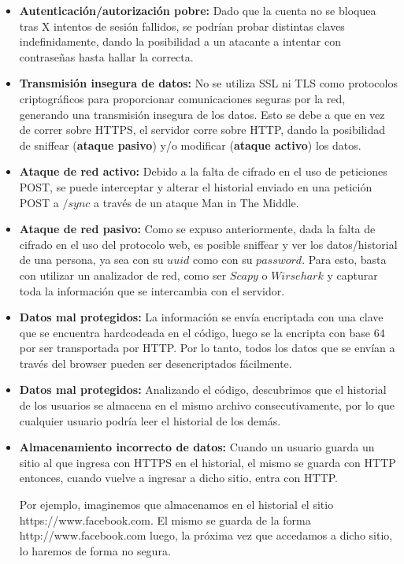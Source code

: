 \documentclass[10pt, a4paper]{article}
\begin{document}
\begin{itemize}
\item \textbf{Autenticación/autorización pobre:} Dado que la cuenta no se bloquea tras X intentos de sesión fallidos, se podrían probar distintas claves indefinidamente, dando la posibilidad a un atacante a intentar con contraseñas hasta hallar la correcta. 

\item \textbf{Transmisión insegura de datos:} No se utiliza SSL ni TLS como protocolos criptográficos para proporcionar comunicaciones seguras por la red, generando una transmisión insegura de los datos. Esto se debe a que en vez de correr sobre HTTPS, el servidor corre sobre HTTP, dando la posibilidad de sniffear (\textbf{ataque pasivo}) y/o modificar (\textbf{ataque activo}) los datos.

\item \textbf{Ataque de red activo:} Debido a la falta de cifrado en el uso de peticiones POST, se puede interceptar y alterar el historial enviado en una petición POST a $/sync$ a través de un ataque Man in The Middle.

\item \textbf{Ataque de red pasivo:} Como se expuso anteriormente, dada la falta de cifrado en el uso del protocolo web, es posible sniffear y ver los datos/historial de una persona, ya sea con su $uuid$ como con su $password$. Para esto, basta con utilizar un analizador de red, como ser $Scapy$ o $Wirsehark$ y capturar toda la información que se intercambia con el servidor.

\item \textbf{Datos mal protegidos:} La información se envía encriptada con una clave que se encuentra hardcodeada en el código, luego se la encripta con base 64 por ser transportada por HTTP. Por lo tanto, todos los datos que se envían a través del browser pueden ser desencriptados fácilmente. 

\item \textbf{Datos mal protegidos:} Analizando el código, descubrimos que el historial de los usuarios se almacena en el mismo archivo consecutivamente, por lo que cualquier usuario podría leer el historial de los demás.


\item \textbf{Almacenamiento incorrecto de datos:} Cuando un usuario guarda un sitio al que ingresa con HTTPS en el historial, el mismo se guarda con HTTP entonces, cuando vuelve a ingresar a dicho sitio, entra con HTTP.

Por ejemplo, imaginemos que almacenamos en el historial el sitio https://www.facebook.com. El mismo se guarda de la forma http://www.facebook.com luego, la próxima vez que accedamos a dicho sitio, lo haremos de forma no segura.


\end{itemize}
\end{document}
